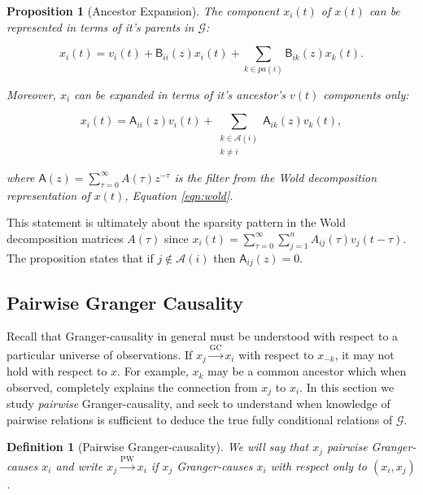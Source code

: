 \documentclass{statsoc}
\def\gc{\overset{\text{GC}}{\rightarrow}}  %
\def\pwgc{\overset{\text{PW}}{\rightarrow}}  %
\def\gcg{\mathcal{G}}  %
\def\B{\mathsf{B}}  %
\def\A{\mathsf{A}}  %
\newcommand{\pa}[1]{pa(#1)}  %
\newcommand{\anc}[1]{\mathcal{A}(#1)}  %
\newtheorem{proposition}{Proposition}
\newtheorem{definition}{Definition}
\begin{document}
\begin{proposition}[Ancestor Expansion]
  \label{prop:parent_expanding}
  The component $x_i(t)$ of $x(t)$ can be represented in terms of it's
  parents in $\gcg$:

  \begin{equation}
    \label{eqn:parent_expansion}
    x_i(t) = v_i(t) + \B_{ii}(z)x_i(t) + \sum_{k \in \pa{i}}\B_{ik}(z)x_k(t).
  \end{equation}

  Moreover, $x_i$ can be expanded in terms of it's ancestor's $v(t)$
  components only:

  \begin{equation}
    \label{eqn:ancestor_expansion}
    x_i(t) = \A_{ii}(z)v_i(t) + \sum_{\substack{k \in \anc{i} \\ k \ne i}}\A_{ik}(z)v_k(t),
  \end{equation}

  where $\A(z) = \sum_{\tau = 0}^\infty A(\tau)z^{-\tau}$ is the filter from
  the Wold decomposition representation of $x(t)$, Equation
  \eqref{eqn:wold}.
\end{proposition}

This statement is ultimately about the sparsity pattern in the Wold
decomposition matrices $A(\tau)$ since
$x_i(t) = \sum_{\tau = 0}^\infty \sum_{j = 1}^n A_{ij}(\tau)v_j(t -
\tau)$.  The proposition states that if $j \not \in \anc{i}$ then
$\A_{ij}(z) = 0$.  

\subsection{Pairwise Granger Causality}
\label{sec:pwgc}
Recall that Granger-causality in general must be understood with
respect to a particular universe of observations.  If $x_j \gc x_i$
with respect to $x_{-k}$, it may not hold with respect to $x$.  For
example, $x_k$ may be a common ancestor which when observed, completely
explains the connection from $x_j$ to $x_i$.  In this section we study
\textit{pairwise} Granger-causality, and seek to understand when
knowledge of pairwise relations is sufficient to deduce the true fully
conditional relations of $\gcg$.

\begin{definition}[Pairwise Granger-causality]
  We will say that $x_j$ pairwise Granger-causes $x_i$ and write
  $x_j \pwgc x_i$ if $x_j$ Granger-causes $x_i$ with respect only to
  $(x_i, x_j)$.
\end{definition}
\end{document}
